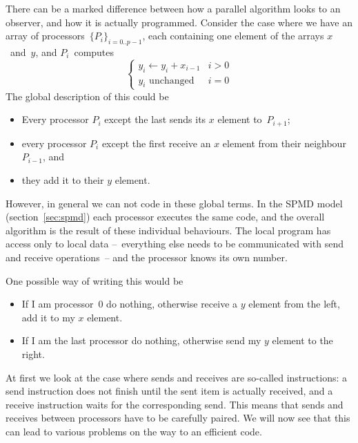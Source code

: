 
There can be a marked difference between how a parallel algorithm looks to an
observer, and how it is actually programmed.
Consider the case where we have an array of processors~$\{P_i\}_{i=0..p-1}$,
each containing one element of the arrays $x$~and~$y$, and
$P_i$~computes
\begin{equation}
\begin{cases}
y_i\leftarrow y_i+x_{i-1}&i>0\\ \mbox{$y_i$ unchanged}&i=0
\end{cases}
\label{eq:mpi-send-left}
\end{equation}
The global description of this could be
\begin{itemize}
\item Every processor $P_i$ except the last sends its $x$ element to~$P_{i+1}$;
\item every processor $P_i$ except the first receive an $x$ element from
  their neighbour~$P_{i-1}$, and
\item they add it to their $y$ element.
\end{itemize}
However, in general we can not code in these global terms.
In the \ac{SPMD} model (section~\ref{sec:spmd}) each
processor executes the same code, and the overall algorithm
is the result of  these individual behaviours. 
The local program has access only to local data --~everything else
needs to be communicated with send and receive operations~-- and the
processor knows its own number.

One possible way of writing this would be
\begin{itemize}
\item If I am processor~0 do nothing, otherwise receive a $y$ element
  from the left, add it to my $x$ element.
\item If I am the last processor do nothing, otherwise send my $y$
  element to the right.
\end{itemize}
At first we look at the case where sends and
receives are so-called 
instructions: a send instruction does not finish until the sent item
is actually received, and a receive instruction waits for the
corresponding send. This means that sends and receives between
processors have to be carefully paired. We will now see that this can
lead to various problems on the way to an efficient code.

